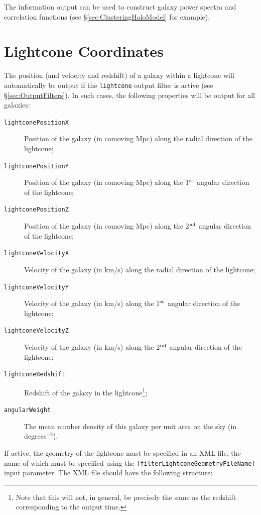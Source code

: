 The information output can be used to construct galaxy power spectra and correlation functions (see \S\ref{sec:ClusteringHaloModel} for example).

\section{Lightcone Coordinates}\label{sec:OutputLightcone}

The position (and velocity and redshift) of a galaxy within a lightcone will automatically be output if the {\tt lightcone} output filter is active (see \S\ref{sec:OutputFilters}). In such cases, the following properties will be output for all galaxies:
\begin{description}
 \item [{\tt lightconePositionX}] Position of the galaxy (in comoving Mpc) along the radial direction of the lightcone;
 \item [{\tt lightconePositionY}] Position of the galaxy (in comoving Mpc) along the 1$^{\rm st}$ angular direction of the lightcone;
 \item [{\tt lightconePositionZ}] Position of the galaxy (in comoving Mpc) along the 2$^{\rm nd}$ angular direction of the lightcone;
 \item [{\tt lightconeVelocityX}] Velocity of the galaxy (in km/s) along the radial direction of the lightcone;
 \item [{\tt lightconeVelocityY}] Velocity of the galaxy (in km/s) along the 1$^{\rm st}$ angular direction of the lightcone;
 \item [{\tt lightconeVelocityZ}] Velocity of the galaxy (in km/s) along the 2$^{\rm nd}$ angular direction of the lightcone;
 \item [{\tt lightconeRedshift}] Redshift of the galaxy in the lightcone\footnote{Note that this will not, in general, be precisely the same as the redshift corresponding to the output time.};
 \item [{\tt angularWeight}] The mean number density of this galaxy per unit area on the sky (in degrees$^{-2}$).
\end{description}
If active, the geometry of the lightcone must be specified in an XML file, the name of which must be specified using the {\tt [filterLightconeGeometryFileName]} input parameter. The XML file should have the following structure:
